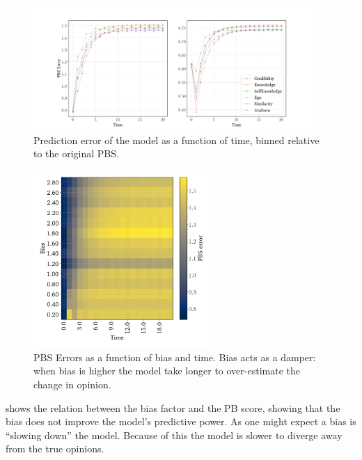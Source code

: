 \begin{figure}[h]
	\begin{center}
		\includegraphics[width=0.95\textwidth]{Figures/errors_binned.png}
	\end{center}
	\caption{Prediction error of the model as a function of time, binned relative to the original  PBS.}\label{fig:binned_errors}
\end{figure}


\begin{figure}[h]
	\centering

	\includegraphics[width=0.6\textwidth]{Figures/bias_time_imshow.png}
	\hspace{1em}
	\caption{PBS Errors as a function of bias and time. Bias acts as a damper: when bias is higher the model take longer to over-estimate the change in opinion.}
	\label{fig:bias_slowdown}
\end{figure}

 shows the relation between the bias factor and the PB
score, showing that the bias does not improve the model's predictive power. As
one might expect a bias is ``slowing down'' the model. Because of this the
model is slower to diverge away from the true opinions.

